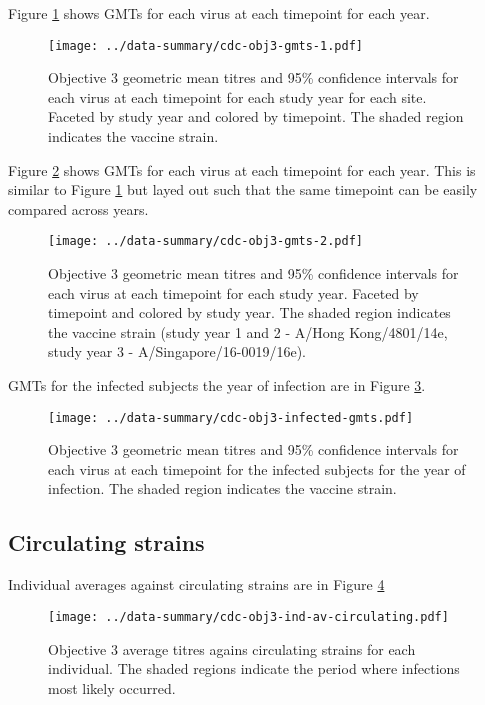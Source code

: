 \documentclass[12pt]{article}
\begin{document}
Figure \ref{fig:cdc-obj3-gmts-1} shows GMTs for each virus at each timepoint for each year.

\begin{figure}
	\texttt{[image: ../data-summary/cdc-obj3-gmts-1.pdf]}
	\caption{Objective 3 geometric mean titres and 95\% confidence intervals for each virus at each timepoint for each study year for each site. Faceted by study year and colored by timepoint. The shaded region indicates the vaccine strain.}
	\label{fig:cdc-obj3-gmts-1}
\end{figure}

Figure \ref{fig:cdc-obj3-gmts-2} shows GMTs for each virus at each timepoint for each year. This is similar to Figure \ref{fig:cdc-obj3-gmts-1} but layed out such that the same timepoint can be easily compared across years.

\begin{figure}
	\texttt{[image: ../data-summary/cdc-obj3-gmts-2.pdf]}
	\caption{Objective 3 geometric mean titres and 95\% confidence intervals for each virus at each timepoint for each study year. Faceted by timepoint and colored by study year. The shaded region indicates the vaccine strain (study year 1 and 2 - A/Hong Kong/4801/14e, study year 3 - A/Singapore/16-0019/16e).}
	\label{fig:cdc-obj3-gmts-2}
\end{figure}

GMTs for the infected subjects the year of infection are in Figure \ref{fig:cdc-obj3-infected-gmts}.

\begin{figure}
	\texttt{[image: ../data-summary/cdc-obj3-infected-gmts.pdf]}
	\caption{Objective 3 geometric mean titres and 95\% confidence intervals for each virus at each timepoint for the infected subjects for the year of infection. The shaded region indicates the vaccine strain.}
	\label{fig:cdc-obj3-infected-gmts}
\end{figure}

\subsection{Circulating strains}

Individual averages against circulating strains are in Figure \ref{fig:cdc-obj3-ind-av-circulating}

\begin{figure}
	\centering
	\texttt{[image: ../data-summary/cdc-obj3-ind-av-circulating.pdf]}
	\caption{Objective 3 average titres agains circulating strains for each individual. The shaded regions indicate the period where infections most likely occurred.}
	\label{fig:cdc-obj3-ind-av-circulating}
\end{figure}
\end{document}
